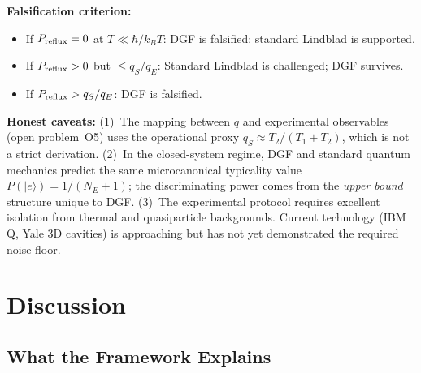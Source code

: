 \documentclass[reprint]{revtex4-2}
\begin{document}
\textbf{Falsification criterion:}
\begin{itemize}
\item If $P_{\rm reflux}=0$ at $T\ll\hbar/k_BT$: DGF is falsified; standard Lindblad is supported.
\item If $P_{\rm reflux}>0$ but $\le q_S/q_E$: Standard Lindblad is challenged; DGF survives.
\item If $P_{\rm reflux}>q_S/q_E$: DGF is falsified.
\end{itemize}

\textbf{Honest caveats:} (1)~The mapping between $q$ and experimental observables (open problem~O5) uses the operational proxy $q_S\approx T_2/(T_1+T_2)$, which is not a strict derivation. (2)~In the closed-system regime, DGF and standard quantum mechanics predict the same microcanonical typicality value $P(|e\rangle)=1/(N_E+1)$; the discriminating power comes from the \emph{upper bound} structure unique to DGF. (3)~The experimental protocol requires excellent isolation from thermal and quasiparticle backgrounds. Current technology (IBM Q, Yale 3D cavities) is approaching but has not yet demonstrated the required noise floor.

\section{Discussion}

\subsection{What the Framework Explains}
\end{document}
